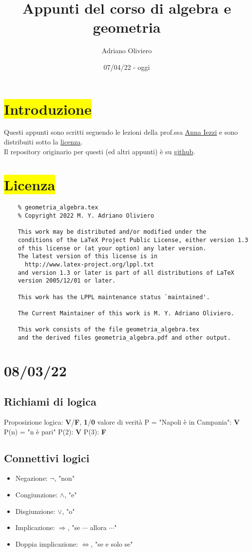 \documentclass{article}
\title{Appunti del corso di algebra e geometria}
\author{Adriano Oliviero}
\date{07/04/22 - oggi}
\newcommand{\hl}[1]{\colorbox{yellow}{#1}}
\begin{document}
\maketitle
\setcounter{tocdepth}{2}
\renewcommand*\contentsname{Indice}
\tableofcontents
\newpage
\section*{\hl{Introduzione}}
Questi appunti sono scritti seguendo le lezioni della prof.ssa \href{https://aiezzi.it/}{Anna Iezzi} e sono distribuiti sotto la \hyperref[sec:Licenza]{licenza}.\\
Il repository originario per questi (ed altri appunti) è su \href{https://github.com/TheDarkBug/notes}{github}.

\section*{\hl{Licenza}}
\label{sec:Licenza}
\begin{verbatim}
	% geometria_algebra.tex
	% Copyright 2022 M. Y. Adriano Oliviero
	
	This work may be distributed and/or modified under the
	conditions of the LaTeX Project Public License, either version 1.3
	of this license or (at your option) any later version.
	The latest version of this license is in
	  http://www.latex-project.org/lppl.txt
	and version 1.3 or later is part of all distributions of LaTeX
	version 2005/12/01 or later.
	
	This work has the LPPL maintenance status `maintained'.
	
	The Current Maintainer of this work is M. Y. Adriano Oliviero.
	
	This work consists of the file geometria_algebra.tex
	and the derived files geometria_algebra.pdf and other output.
\end{verbatim}

\section{08/03/22}
\subsection{Richiami di logica}
Proposizione logica: \textbf{V}/\textbf{F}, \textbf{1}/\textbf{0} valore di verità
P = "Napoli è in Campania": \textbf{V}
P(n) = "n è pari"
P(2): \textbf{V}
P(3): \textbf{F}
\subsection{Connettivi logici}
\begin{itemize}
	\item Negazione: $\neg$, "non"
	\item Congiunzione: $\wedge$, "e"
	\item Disgiunzione: $\vee$, "o"
	\item Implicazione: $\Rightarrow$, "se $\cdots$ allora $\cdots$"
	\item Doppia implicazione: $\Leftrightarrow$, "se e solo se"
\end{itemize}
\end{document}
